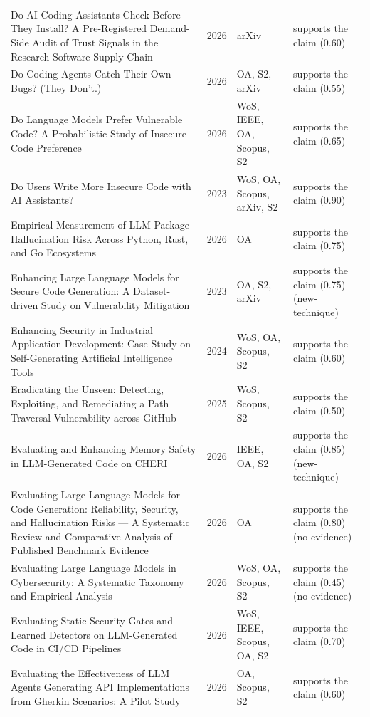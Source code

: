 \begin{longtable}{@{}%
  >{\raggedright\arraybackslash}p{}c%
  >{\raggedright\arraybackslash}p{}%
  >{\raggedright\arraybackslash}p{}@{}}
Do AI Coding Assistants Check Before They Install? A Pre-Registered Demand-Side Audit of Trust Signals in the Research Software Supply Chain & 2026 & arXiv & supports the claim (0.60) \\
Do Coding Agents Catch Their Own Bugs? (They Don't.) & 2026 & OA, S2, arXiv & supports the claim (0.55) \\
Do Language Models Prefer Vulnerable Code? A Probabilistic Study of Insecure Code Preference & 2026 & WoS, IEEE, OA, Scopus, S2 & supports the claim (0.65) \\
Do Users Write More Insecure Code with AI Assistants? & 2023 & WoS, OA, Scopus, arXiv, S2 & supports the claim (0.90) \\
Empirical Measurement of LLM Package Hallucination Risk Across Python, Rust, and Go Ecosystems & 2026 & OA & supports the claim (0.75) \\
Enhancing Large Language Models for Secure Code Generation: A Dataset-driven Study on Vulnerability Mitigation & 2023 & OA, S2, arXiv & supports the claim (0.75) (new-technique) \\
Enhancing Security in Industrial Application Development: Case Study on Self-Generating Artificial Intelligence Tools & 2024 & WoS, OA, Scopus, S2 & supports the claim (0.60) \\
Eradicating the Unseen: Detecting, Exploiting, and Remediating a Path Traversal Vulnerability across GitHub & 2025 & WoS, Scopus, S2 & supports the claim (0.50) \\
Evaluating and Enhancing Memory Safety in LLM-Generated Code on CHERI & 2026 & IEEE, OA, S2 & supports the claim (0.85) (new-technique) \\
Evaluating Large Language Models for Code Generation: Reliability, Security, and Hallucination Risks --- A Systematic Review and Comparative Analysis of Published Benchmark Evidence & 2026 & OA & supports the claim (0.80) (no-evidence) \\
Evaluating Large Language Models in Cybersecurity: A Systematic Taxonomy and Empirical Analysis & 2026 & WoS, OA, Scopus, S2 & supports the claim (0.45) (no-evidence) \\
Evaluating Static Security Gates and Learned Detectors on LLM-Generated Code in CI/CD Pipelines & 2026 & WoS, IEEE, Scopus, OA, S2 & supports the claim (0.70) \\
Evaluating the Effectiveness of LLM Agents Generating API Implementations from Gherkin Scenarios: A Pilot Study & 2026 & OA, Scopus, S2 & supports the claim (0.60) \\

\end{longtable}
